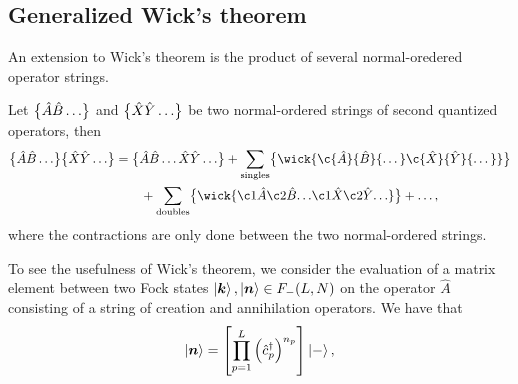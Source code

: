         \subsection{Generalized Wick's theorem}
            An extension to Wick's theorem is the product of several
            normal-oredered operator strings.
            \begin{theorem}
                \label{theorem:wick-general}
                Let $\normalord{\hat{A}\hat{B}\dots}$ and
                $\normalord{\hat{X}\hat{Y}\dots}$ be two normal-ordered strings of
                second quantized operators, then
                \begin{align}
                    \normalord{\hat{A}\hat{B}\dots}
                    \normalord{\hat{X}\hat{Y}\dots}
                    &= \normalord{\hat{A}\hat{B}\dots\hat{X}\hat{Y}\dots}
                    + \sum_{\text{singles}}
                    \normalord{
                        \wick{
                            \c {\hat{A}}
                            {\hat{B}}
                            {\dots}
                            \c {\hat{X}}
                            {\hat{Y}}
                            {\dots}
                        }
                    }
                    \nonumber \\
                    &\qquad
                    + \sum_{\text{doubles}}
                    \normalord{
                        \wick{
                            \c1 {\hat{A}}
                            \c2 {\hat{B}}
                            {\dots}
                            \c1 {\hat{X}}
                            \c2 {\hat{Y}}
                            {\dots}
                        }
                    }
                    + \dots,
                \end{align}
                where the contractions are only done between the two
                normal-ordered strings.
            \end{theorem}
            To see the usefulness of Wick's theorem, we consider the evaluation
            of a matrix element between two Fock states $\ket{\boldsymbol{k}},
            \ket{\boldsymbol{n}} \in F_{-}(L, N)$ on the operator $\hat{A}$ consisting
            of a string of creation and annihilation operators.
            We have that
            \begin{align}
                \ket{\boldsymbol{n}}
                = \left[ 
                    \prod_{p = 1}^{L}\left( 
                        \hat{c}_{p}^{\dagger}
                     \right)^{n_p}
                 \right]\ket{-},
            \end{align}
